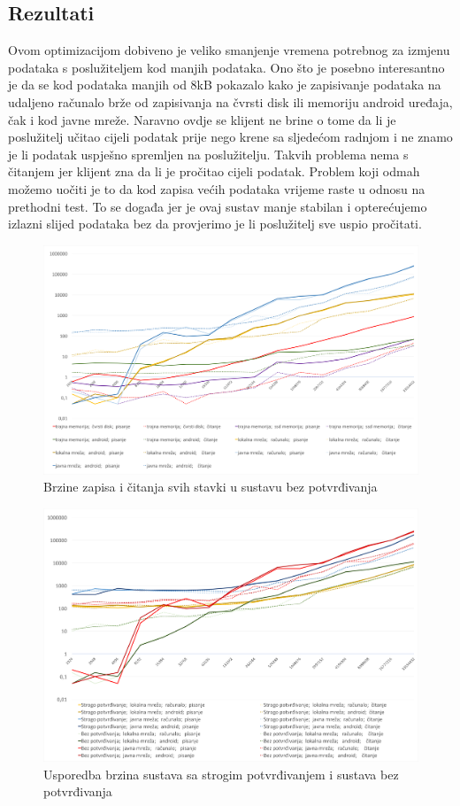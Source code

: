 \documentclass[times, utf8, zavrsni, square]{fer}
\begin{document}
\subsection{Rezultati}
Ovom optimizacijom dobiveno je veliko smanjenje vremena potrebnog za izmjenu podataka s poslužiteljem kod manjih podataka.
Ono što je posebno interesantno je da se kod podataka manjih od 8kB pokazalo kako je zapisivanje podataka na udaljeno računalo 
brže od zapisivanja na čvrsti disk ili memoriju android uređaja, čak i kod javne mreže. 
Naravno ovdje se klijent ne brine o tome da li je poslužitelj učitao cijeli podatak prije nego krene sa sljedećom radnjom i ne znamo je li podatak uspješno spremljen na poslužitelju.
Takvih problema nema s čitanjem jer klijent zna da li je pročitao cijeli podatak.
Problem koji odmah možemo uočiti je to da kod zapisa većih podataka vrijeme raste u odnosu na prethodni test.
To se događa jer je ovaj sustav manje stabilan i opterećujemo izlazni slijed podataka bez da provjerimo je li poslužitelj sve uspio pročitati.
\begin{figure}[h!]
    \centering
    \includegraphics[width=1.5\textwidth, angle = 90]{2_graf}
    \caption{Brzine zapisa i čitanja svih stavki u sustavu bez potvrđivanja}
    \label{fig:graf}
\end{figure}
\begin{figure}[h!]
    \centering
    \includegraphics[width=1.5\textwidth, angle = 90]{2_1}
    \caption{Usporedba brzina sustava sa strogim potvrđivanjem i sustava bez potvrđivanja}
    \label{fig:graf_2_1}
\end{figure}
\FloatBarrier
\end{document}
